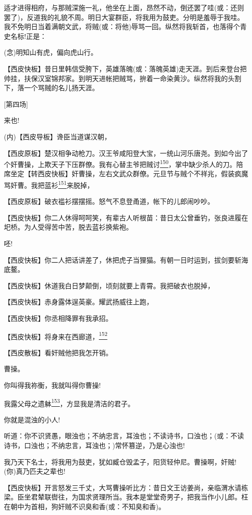适才进得相府，与那贼深施一礼，他坐在上面，昂然不动，倒还罢了哇(或：还则罢了)，反道我的礼貌不周。明日大宴群臣，将我用为鼓吏。分明是羞辱于我哇。我不免明日当着满朝文武，将贼(或：将他)辱骂一回。纵然将我斩首，也落得个青史名标!正是：

(念)明知山有虎，偏向虎山行。

【西皮快板】昔日里韩信受胯下，英雄落魄(或：落魄英雄)走天涯。到后来登台把帅挂，扶保汉室锦邦家。到明天进帐把贼骂，拚着一命染黄沙。纵然将我的头割下，落一个骂贼的名儿扬天涯。

{[}第四场{]}

来也!

(内)【西皮导板】谗臣当道谋汉朝，

【西皮原板】楚汉相争动枪刀。汉王爷咸阳登大宝，一统山河乐唐尧。到如今出了个奸曹操，上欺天子下压群僚。我有心替主爷把贼讨\protect\hyperlink{fn150}{\textsuperscript{150}}，掌中缺少杀人的刀。陪席坐定【转西皮快板】奸曹操，左右文武众群僚。元旦节与贼个不祥兆，假装疯魔骂奸曹。我把蓝衫\protect\hyperlink{fn151}{\textsuperscript{151}}来脱掉，

【西皮原板】破衣褴衫摆摆摇。怒气不息登甬道，帐下的儿郎闹吵吵。

【西皮快板】你二人休得呵呵笑，有辈古人听根苗：昔日太公曾垂钓，张良进履在圯桥。为人受得苦中苦，脱去蓝衫换紫袍。

呸!

【西皮快板】你二人把话讲差了，休把虎子当狸猫。有朝一日时运到，拔剑要斩海底鳌。

【西皮快板】休道我白日梦颠倒，顷刻就要上青霄。我把破衣也脱掉，

【西皮快板】赤身露体逞英豪。耀武扬威往上跑，

【西皮快板】你丞相降罪有我承招。

【西皮快板】将身来在西廊道，\protect\hyperlink{fn152}{\textsuperscript{152}}

【西皮散板】看奸贼他把我怎开销。

曹操。

你叫得我祢衡，我就叫得你曹操!

我露父母之遗躰\protect\hyperlink{fn153}{\textsuperscript{153}}，方显我是清洁的君子。

你就是混浊的小人!

听道：你不识贤愚，眼浊也；不纳忠言，耳浊也；不读诗书，口浊也；(或：不读诗书，口浊也；不纳忠言，耳浊也；)常怀篡逆，乃是心浊也!

我乃天下名士，将我用为鼓吏，犹如臧仓毁孟子，阳货轻仲尼。曹操啊，奸贼!(你)真乃匹夫之辈也!

【西皮快板】开言怒发三千丈，大骂曹操听比方：昔日文王访姜尚，亲临渭水请栋梁。臣坐君辇联辔往，为国求贤理所当。我本是堂堂奇男子，把我当作小儿郎。枉在朝中为首相，狗奸贼不识臭和香(或：不知臭和香)。

